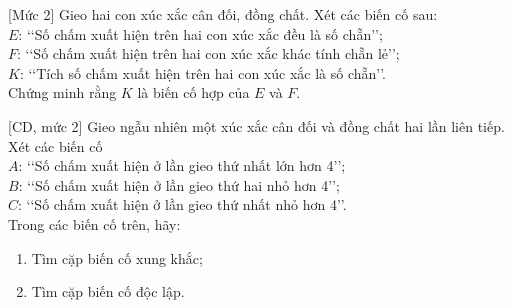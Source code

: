 \begin{bt}%
[Mức 2]
	Gieo hai con xúc xắc cân đối, đồng chất. Xét các biến cố sau:\\
	$E$: \lq\lq Số chấm xuất hiện trên hai con xúc xắc đều là số chẵn\rq\rq;\\
	$F$: \lq\lq Số chấm xuất hiện trên hai con xúc xắc khác tính chẵn lẻ\rq\rq;\\
	$K$: \lq\lq Tích số chấm xuất hiện trên hai con xúc xắc là số chẵn\rq\rq.\\
	Chứng minh rằng $K$ là biến cố hợp của $E$ và $F$.
\end{bt}

\begin{bt}%
[CD, mức 2]%
	Gieo ngẫu nhiên một xúc xắc cân đối và đồng chất hai lần liên tiếp. Xét các biến cố\\
	$A$: \lq\lq Số chấm xuất hiện ở lần gieo thứ nhất lớn hơn 4\rq\rq ;\\
	$B$: \lq\lq Số chấm xuất hiện ở lần gieo thứ hai nhỏ hơn 4\rq\rq ;\\
	$C$: \lq\lq Số chấm xuất hiện ở lần gieo thứ nhất nhỏ hơn 4\rq\rq.\\
	Trong các biến cố trên, hãy:
	\begin{enumerate}
		\item Tìm cặp biến cố xung khắc;
		\item Tìm cặp biến cố độc lập.
	\end{enumerate}
\end{bt}

